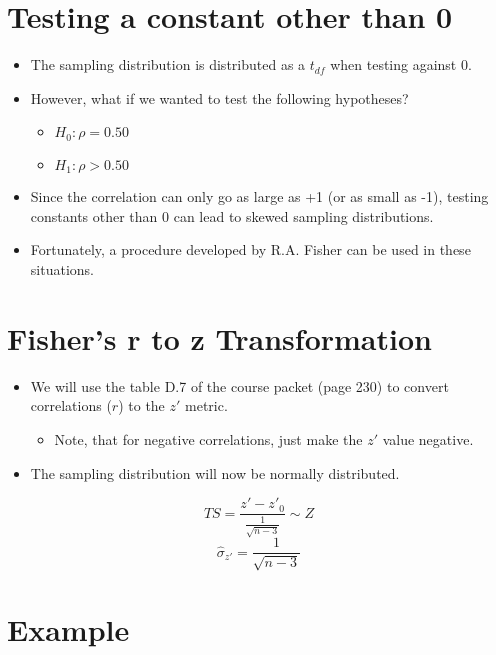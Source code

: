 \documentclass[12pt]{article}
\begin{document}
\section{Testing a constant other than
0}\label{testing-a-constant-other-than-0}

\begin{itemize}
\itemsep1pt\parskip0pt
\item
  The sampling distribution is distributed as a \(t_{df}\) when testing
  against 0.
\item
  However, what if we wanted to test the following hypotheses?

  \begin{itemize}
  \itemsep1pt\parskip0pt
  \item
    \(H_{0}: \rho = 0.50\)
  \item
    \(H_{1}: \rho > 0.50\)
  \end{itemize}
\item
  Since the correlation can only go as large as +1 (or as small as -1),
  testing constants other than 0 can lead to skewed sampling
  distributions.
\item
  Fortunately, a procedure developed by R.A. Fisher can be used in these
  situations.
\end{itemize}

\section{Fisher's r to z
Transformation}\label{fishers-r-to-z-transformation}

\begin{itemize}
\itemsep1pt\parskip0pt
\item
  We will use the table D.7 of the course packet (page 230) to convert
  correlations (\(r\)) to the \(z'\) metric.

  \begin{itemize}
  \itemsep1pt\parskip0pt
  \item
    Note, that for negative correlations, just make the \(z'\) value
    negative.
  \end{itemize}
\item
  The sampling distribution will now be normally distributed.
\end{itemize}

\[ TS = \frac{z' - z'_{0}}{\frac{1}{\sqrt{n - 3}}} \sim Z \]
\[ \hat{\sigma}_{z'} = \frac{1}{\sqrt{n - 3}} \]

\section{Example}\label{example-1}
\end{document}
